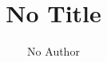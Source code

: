 \documentclass[letterpaper,twoside,11pt]{book}
\title{No Title}
\author{No Author}
\date{}
\begin{document}
\nocite{*}
\printbibliography
\end{document}
